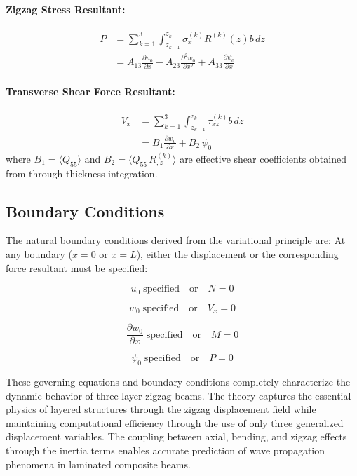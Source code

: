 \documentclass[12pt,a4paper]{report}
\begin{document}
\paragraph{Zigzag Stress Resultant:}
\begin{align}
P &= \sum_{k=1}^{3} \int_{z_{k-1}}^{z_k} \sigma_x^{(k)} R^{(k)}(z) b \, dz \nonumber \\
  &= A_{13} \frac{\partial u_0}{\partial x} 
   - A_{23} \frac{\partial^2 w_0}{\partial x^2} 
   + A_{33} \frac{\partial \psi_0}{\partial x}
\end{align}

\paragraph{Transverse Shear Force Resultant:}
\begin{align}
V_x &= \sum_{k=1}^{3} \int_{z_{k-1}}^{z_k} \tau_{xz}^{(k)} b \, dz \nonumber \\
    &= B_{1} \frac{\partial w_0}{\partial x} + B_{2} \, \psi_0
\end{align}
where $B_{1} = \langle Q_{55} \rangle$ and $B_{2} = \langle Q_{55} \, R^{(k)}_{,z} \rangle$ are effective shear coefficients obtained from through-thickness integration.

\subsection*{Boundary Conditions}

The natural boundary conditions derived from the variational principle are:  
At any boundary ($x = 0$ or $x = L$), either the displacement or the corresponding force resultant must be specified:

\[
u_0 \; \text{specified} \quad \text{or} \quad N = 0
\]

\[
w_0 \; \text{specified} \quad \text{or} \quad V_x = 0
\]

\[
\frac{\partial w_0}{\partial x} \; \text{specified} \quad \text{or} \quad M = 0
\]

\[
\psi_0 \; \text{specified} \quad \text{or} \quad P = 0
\]

These governing equations and boundary conditions completely characterize the dynamic behavior of three-layer zigzag beams. The theory captures the essential physics of layered structures through the zigzag displacement field while maintaining computational efficiency through the use of only three generalized displacement variables. The coupling between axial, bending, and zigzag effects through the inertia terms enables accurate prediction of wave propagation phenomena in laminated composite beams.
\end{document}
